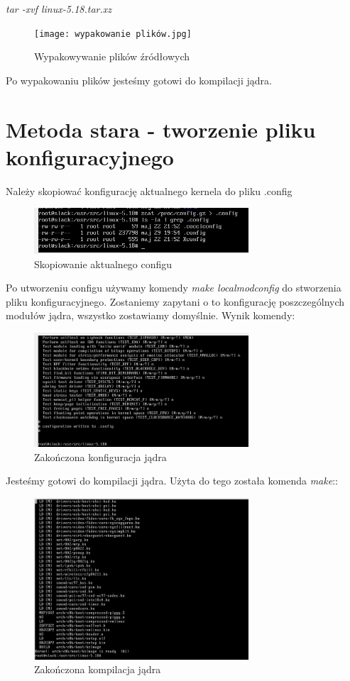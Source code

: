 \documentclass[12pt]{article}
\begin{document}
\centering\textit{tar -xvf linux-5.18.tar.xz}

\begin{figure}[H]
\centering
\texttt{[image: wypakowanie plików.jpg]}
\caption{Wypakowywanie plików źródłowych}
\end{figure}

Po wypakowaniu plików jesteśmy gotowi do kompilacji jądra.

\section{Metoda stara - tworzenie pliku konfiguracyjnego}

Należy skopiować konfigurację aktualnego kernela do pliku .config

\begin{figure}[H]
\centering
\includegraphics[width=8cm]{config copy.jpg}
\caption{Skopiowanie aktualnego configu}
\end{figure}

Po utworzeniu configu używamy komendy \textit{make localmodconfig} do stworzenia pliku konfiguracyjnego. Zostaniemy zapytani o to konfigurację poszczególnych modułów jądra, wszystko zostawiamy domyślnie. Wynik komendy:

\begin{figure}[H]
\centering
\includegraphics[width=8cm]{konfig jonder.jpg}
\caption{Zakończona konfiguracja jądra}
\end{figure}

Jesteśmy gotowi do kompilacji jądra. Użyta do tego została komenda \textit{make}::

\begin{figure}[H]
\centering
\includegraphics[width=8cm]{kompilacjajadra.jpg}
\caption{Zakończona kompilacja jądra}
\end{figure}
\end{document}
